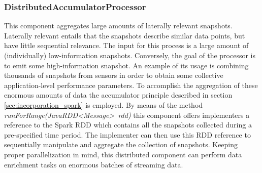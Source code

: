 \subsubsection{DistributedAccumulatorProcessor}
This component aggregates large amounts of laterally relevant snapshots. Laterally relevant entails that the snapshots describe similar data points, but have little sequential relevance. The input for this process is a large amount of (individually) low-information snapshots. Conversely, the goal of the processor is to emit some high-information snapshot. An example of its usage is combining thousands of snapshots from sensors in order to obtain some collective application-level performance parameters. To accomplish the aggregation of these enormous amounts of data the accumulator principle described in section \ref{sec:incorporation_spark} is employed. By means of the method \emph{runForRange(JavaRDD\textless Message\textgreater\ rdd)} this component offers implementers a reference to the Spark RDD which contains all the snapshots collected during a pre-specified time period. The implementer can then use this RDD reference to sequentially manipulate and aggregate the collection of snapshots. Keeping proper parallelization in mind, this distributed component can perform data enrichment tasks on enormous batches of streaming data.


